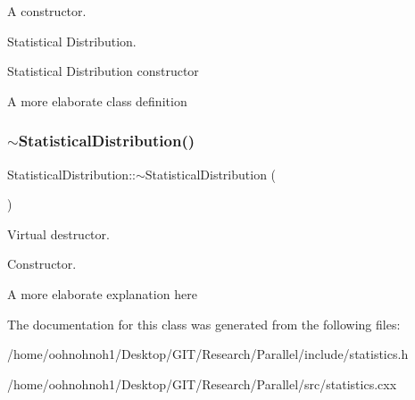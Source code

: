 A constructor. 

Statistical Distribution.

Statistical Distribution constructor

A more elaborate class definition \mbox{\label{classStatisticalDistribution_a6bd83bc866a8156a3df846b98afe659a}} 
\subsubsection{\texorpdfstring{$\sim$\+Statistical\+Distribution()}{~StatisticalDistribution()}}
{\footnotesize\ttfamily Statistical\+Distribution\+::$\sim$\+Statistical\+Distribution (\begin{DoxyParamCaption}{ }\end{DoxyParamCaption})\hspace{0.3cm}{\ttfamily [virtual]}}



Virtual destructor. 

Constructor.

A more elaborate explanation here 

The documentation for this class was generated from the following files\+:\begin{DoxyCompactItemize}
\item 
/home/oohnohnoh1/\+Desktop/\+G\+I\+T/\+Research/\+Parallel/include/statistics.\+h\item 
/home/oohnohnoh1/\+Desktop/\+G\+I\+T/\+Research/\+Parallel/src/statistics.\+cxx\end{DoxyCompactItemize}
